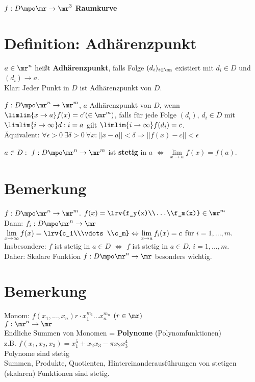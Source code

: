 		$ f:D\mpo\mr\rightarrow\mr^3 $ \textbf{Raumkurve}
	\subExEnd

\section{Definition: Adhärenzpunkt}
		\item $ a\in\mr^n $ heißt \textbf{Adhärenzpunkt}, falls Folge $ (d_i)_{i\in\mn} $ existiert mit $ d_i\in D $ und $ (d_i)\rightarrow a $.\\
		Klar: Jeder Punkt in $ D $ ist Adhärenzpunkt von $ D $.
		
		\item $ f:D\mpo\mr^n\rightarrow\mr^m $, $ a $ Adhärenzpunkt von $ D $, wenn $ \limlim{x\rightarrow a}f(x)=c'(\in\mr^m) $, falls für jede Folge $ (d_i) $, $ d_i\in D $ mit $ \limlim{i\rightarrow\infty}d:i=a $ gilt $ \limlim{i\rightarrow\infty}f(d_i)=c $.\\
		Äquivalent: $ \forall\epsilon >0\ \exists\delta>0\ \forall x:||x-a||<\delta\Rightarrow||f(x)-c||<\epsilon $
		
		\item $ a\in D:\ f:D\mpo\mr^n\rightarrow\mr^m $ ist \textbf{stetig} in $ a $ $ \Leftrightarrow $ $ \lim\limits_{x\rightarrow a}f(x)=f(a) $.
	\subExEnd

\section{Bemerkung}
	$ f:D\mpo\mr^n\rightarrow\mr^m $. $ f(x)=\lrv{f_y(x)\\...\\f_m(x)}\in\mr^m$\\
	Dann: $ f_i:D\mpo\mr^n\rightarrow\mr $\\
	$ \lim\limits_{x\rightarrow\infty}f(x)=\lrv{c_1\\\vdots\\c_m}\Leftrightarrow\lim\limits_{x\rightarrow a}f_i(x)=c $ für $ i=1,...,m $.\\
	Insbesondere: $ f $ ist stetig in $ a\in D $ $ \Leftrightarrow $ $ f $ ist stetig in $ a\in D $, $ i=1,...,m $.\\
	Daher: Skalare Funktion $ f:D\mpo\mr^n\rightarrow\mr $ besonders wichtig.
	
\section{Bemerkung}
	Monom: $ f(x_1,...,x_n)r\cdot x_1^{m_1}...x_n^{m_n} $ $ (r\in\mr) $\\
	$ f:\mr^n\rightarrow\mr $\\
	Endliche Summen von Monomen = \textbf{Polynome} (Polynomfunktionen)\\
	z.B. $ f(x_1,x_2,x_3)=x_1^5+x_2x_3-\pi x_2x_3^4 $\\
	Polynome sind stetig\\
	Summen, Produkte, Quotienten, Hintereinanderausführungen von stetigen (skalaren) Funktionen sind stetig.
	

